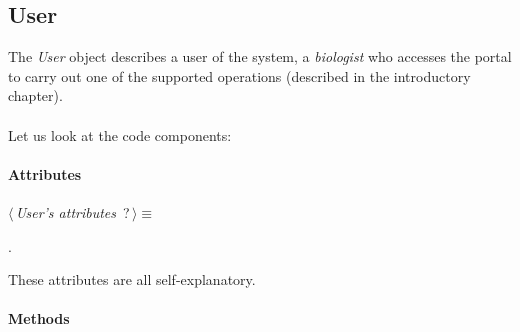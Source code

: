 \subsection{User}
The \emph{User} object describes a user of the system, a \emph{biologist} who accesses the portal to carry out one of the supported operations (described in the introductory chapter).
\\
\\Let us look at the code components:

\paragraph{Attributes}      

	\begin{flushleft} \small
\begin{minipage}{\linewidth}\label{scrap17}\raggedright\small
{} $\langle\,${\itshape {User's attributes}}\nobreak\ {\footnotesize {?}}$\,\rangle\equiv$
\vspace{-1ex}
\begin{list}{}{} \item

                
        {\NWsep}
\end{list}
\vspace{-1.5ex}
\footnotesize
\begin{list}{}{\setlength{\itemsep}{-\parsep}\setlength{\itemindent}{-\leftmargin}}
\item {\NWtxtMacroNoRef}.

\item{}
\end{list}
\end{minipage}\vspace{4ex}
\end{flushleft}
These attributes are all self-explanatory.

\paragraph{Methods} 

